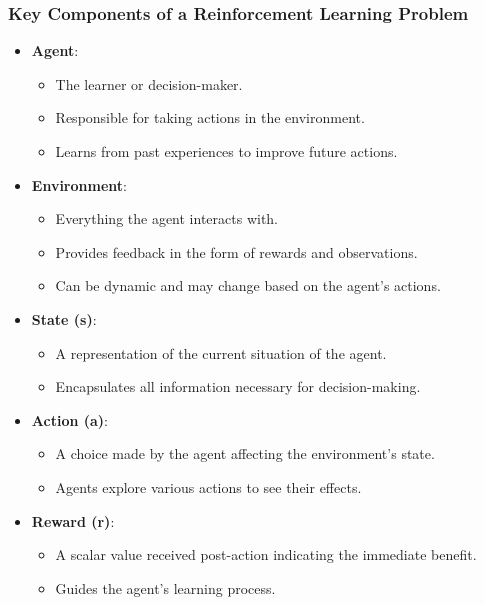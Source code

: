 \documentclass[aspectratio=169]{beamer}
\begin{document}
\begin{frame}[fragile]
    \frametitle{Key Components of a Reinforcement Learning Problem}
    \begin{itemize}
        \item \textbf{Agent}:
        \begin{itemize}
            \item The learner or decision-maker.
            \item Responsible for taking actions in the environment.
            \item Learns from past experiences to improve future actions.
        \end{itemize}

        \item \textbf{Environment}:
        \begin{itemize}
            \item Everything the agent interacts with.
            \item Provides feedback in the form of rewards and observations.
            \item Can be dynamic and may change based on the agent's actions.
        \end{itemize}

        \item \textbf{State (s)}:
        \begin{itemize}
            \item A representation of the current situation of the agent.
            \item Encapsulates all information necessary for decision-making.
        \end{itemize}

        \item \textbf{Action (a)}:
        \begin{itemize}
            \item A choice made by the agent affecting the environment's state.
            \item Agents explore various actions to see their effects.
        \end{itemize}

        \item \textbf{Reward (r)}:
        \begin{itemize}
            \item A scalar value received post-action indicating the immediate benefit.
            \item Guides the agent's learning process.
        \end{itemize}


\end{itemize}
\end{frame}
\end{document}
